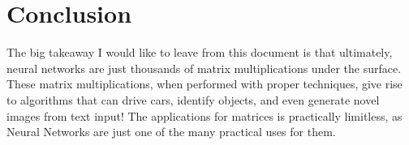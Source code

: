 \documentclass{article}
\begin{document}
\section{Conclusion}
The big takeaway I would like to leave from this document is that ultimately, neural networks are just thousands of matrix multiplications under the surface. These matrix multiplications, when performed with proper techniques, give rise to algorithms that can drive cars, identify objects, and even generate novel images from text input! The applications for matrices is practically limitless, as Neural Networks are just one of the many practical uses for them.
\end{document}
